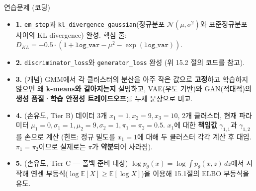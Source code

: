 \documentclass[aspectratio=169,11pt]{beamer}
\begin{document}
\begin{frame}{연습문제 (코딩)}
  \begin{itemize}
    \item \textbf{1.} \texttt{em\_step}과
      \texttt{kl\_divergence\_gaussian}(정규분포
      $\mathcal{N}(\mu, \sigma^2)$와 표준정규분포 사이의 KL
      divergence) 완성. \; 핵심 줄:
      $D_{KL} = -0.5 \cdot (1 + \texttt{log\_var} - \mu^2
      - \exp(\texttt{log\_var}))$.
    \item \textbf{2.} \texttt{discriminator\_loss}와
      \texttt{generator\_loss} 완성 (위 15.2 절의 코드를 참고).
    \item \textbf{3.} (개념) GMM에서 각 클러스터의 분산을 아주
      작은 값으로 \textbf{고정}하고 학습하지 않으면 왜
      \textbf{k-means와 같아지는지} 설명하고, VAE(우도 기반)와
      GAN(적대적)의 \textbf{생성 품질·학습 안정성 트레이드오프}를
      두세 문장으로 비교.
    \item \textbf{4.} (손유도, Tier B) 데이터 3개
      $x_1 = 1, x_2 = 9, x_3 = 10$, 2개 클러스터, 현재 파라미터
      $\mu_1 = 0, \sigma_1 = 1, \mu_2 = 9, \sigma_2 = 1,
      \pi_1 = \pi_2 = 0.5$. $x_1$에 대한 \textbf{책임값}
      $\gamma_{1,1}$과 $\gamma_{1,2}$를 손으로 계산 (힌트: 정규
      밀도를 $x_1 = 1$에 대해 두 클러스터 각각 계산 후 대입.
      $\pi_1 = \pi_2$이므로 실제로는 $\pi$가 \textbf{약분}되어
      사라짐).
    \item \textbf{5.} (손유도, Tier C — 폴백 준비 대상)
      $\log p_\theta(x) = \log \int p_\theta(x,z)\,dz$에서 시작해
      옌센 부등식($\log \mathbb{E}[X] \ge \mathbb{E}[\log X]$)을
      이용해 15.1절의 ELBO 부등식을 유도.
  \end{itemize}
\end{frame}

\end{document}
